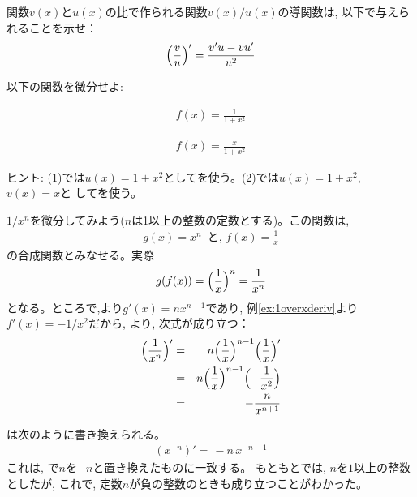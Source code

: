 \begin{q}\label{q:diff_func4} 関数$v(x)$と$u(x)$の比で作られる関数$v(x)/u(x)$の導関数は, 以下で与えられることを示せ：
\begin{eqnarray}
\Bigl(\frac{v}{u}\Bigr)'=\frac{v'u-vu'}{u^2}\label{eq:difdiv}
\end{eqnarray}\end{q}
\mv

\begin{q}\label{q:diff_func5} 以下の関数を微分せよ:
\begin{edaenumerate}
\item \begin{eqnarray*}f(x)=\frac{1}{1+x^2}\end{eqnarray*}
\item \begin{eqnarray*}f(x)=\frac{x}{1+x^2}\end{eqnarray*}
\end{edaenumerate}
ヒント: (1)では$u(x)=1+x^2$としてを使う。(2)では$u(x)=1+x^2$, $v(x)=x$と
してを使う。
\end{q}
\mv

\begin{exmpl}  $1/x^n$を微分してみよう($n$は1以上の整数の定数とする)。この関数は, 
\begin{eqnarray*}g(x)=x^n\,\,\,\text{と, }f(x)=\frac{1}{x}\end{eqnarray*}
の合成関数とみなせる。実際
\begin{eqnarray}g(f(x))=\Bigl(\frac{1}{x}\Bigr)^n=\frac{1}{x^n}\end{eqnarray}
となる。ところで,より$g'(x)=nx^{n-1}$であり, 例\ref{ex:1overxderiv}より$f'(x)=-1/x^2$だから, 
より, 次式が成り立つ：
\begin{eqnarray}
\Bigl(\frac{1}{x^n}\Bigr)'&=&n\Bigl(\frac{1}{x}\Bigr)^{n-1}\Bigl(\frac{1}{x}\Bigr)'\nonumber\\
     &=&n\Bigl(\frac{1}{x}\Bigr)^{n-1}\Bigl(-\frac{1}{x^2}\Bigr)\nonumber\\
     &=&-\frac{n}{x^{n+1}}
\label{eq:xpowminusn1}\end{eqnarray}
\end{exmpl}

は次のように書き換えられる。
\begin{eqnarray}(x^{-n})'=\,-n\,x^{-n-1}\label{eq:xpowminusn3}\end{eqnarray}
これは, で$n$を$-n$と置き換えたものに一致する。
もともとでは, $n$を$1$以上の整数としたが, これで, 
定数$n$が負の整数のときも成り立つことがわかった。\hv

